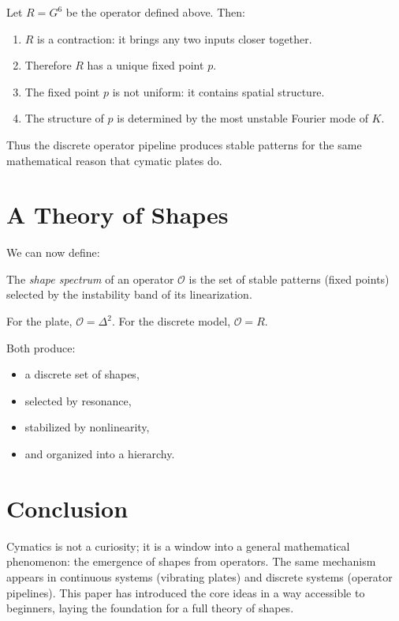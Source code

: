 \documentclass{article}
\begin{document}
\begin{theorem} Let $R = G^6$ be the operator defined above. Then: \begin{enumerate} \item $R$ is a contraction: it brings any two inputs closer together. \item Therefore $R$ has a unique fixed point $p$. \item The fixed point $p$ is not uniform: it contains spatial structure. \item The structure of $p$ is determined by the most unstable Fourier mode of $K$. \end{enumerate} Thus the discrete operator pipeline produces stable patterns for the same mathematical reason that cymatic plates do. \end{theorem}

\section{A Theory of Shapes}

We can now define:

\begin{definition} The \emph{shape spectrum} of an operator $\mathcal{O}$ is the set of stable patterns (fixed points) selected by the instability band of its linearization. \end{definition}

For the plate, $\mathcal{O} = \Delta^2$.
For the discrete model, $\mathcal{O} = R$.

Both produce: \begin{itemize} \item a discrete set of shapes, \item selected by resonance, \item stabilized by nonlinearity, \item and organized into a hierarchy. \end{itemize}

\section{Conclusion}

Cymatics is not a curiosity; it is a window into a general mathematical phenomenon: the emergence of shapes from operators. The same mechanism appears in continuous systems (vibrating plates) and discrete systems (operator pipelines). This paper has introduced the core ideas in a way accessible to beginners, laying the foundation for a full theory of shapes. 
\end{document}
